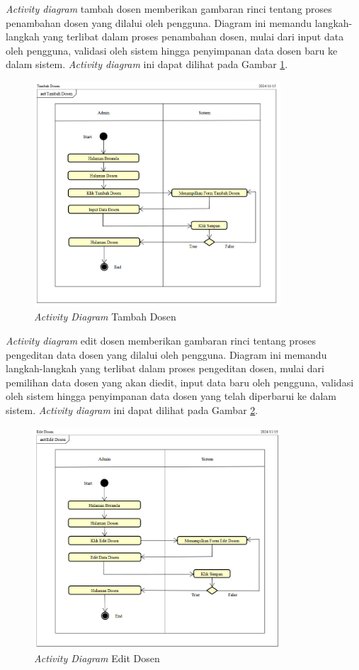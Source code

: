\textit{Activity diagram} tambah dosen memberikan gambaran rinci tentang proses penambahan dosen yang dilalui oleh pengguna. Diagram ini memandu langkah-langkah yang terlibat dalam proses penambahan dosen, mulai dari input data oleh pengguna, validasi oleh sistem hingga penyimpanan data dosen baru ke dalam sistem. \textit{Activity diagram} ini dapat dilihat pada Gambar \ref{activity-diagram-tambah-dosen}.
\begin{figure}
	\centering
	\includegraphics[width=0.82\textwidth]{konten/gambar/activity-diagram/tambah-dosen.png}
	\caption{\textit{Activity Diagram} Tambah Dosen}
	\label{activity-diagram-tambah-dosen}
\end{figure}

\textit{Activity diagram} edit dosen memberikan gambaran rinci tentang proses pengeditan data dosen yang dilalui oleh pengguna. Diagram ini memandu langkah-langkah yang terlibat dalam proses pengeditan dosen, mulai dari pemilihan data dosen yang akan diedit, input data baru oleh pengguna, validasi oleh sistem hingga penyimpanan data dosen yang telah diperbarui ke dalam sistem. \textit{Activity diagram} ini dapat dilihat pada Gambar \ref{activity-diagram-edit-dosen}.
\begin{figure}
	\centering
	\includegraphics[width=0.82\textwidth]{konten/gambar/activity-diagram/edit-dosen.png}
	\caption{\textit{Activity Diagram} Edit Dosen}
	\label{activity-diagram-edit-dosen}
\end{figure}

